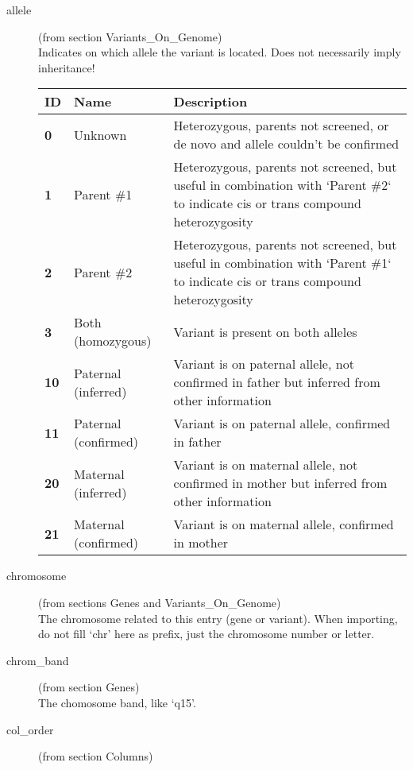 \documentclass[a4paper,oneside,openany,12pt]{memoir}
\begin{document}
\begin{description}
  \item[allele] (from section Variants\_On\_Genome)\hfill \\
  Indicates on which allele the variant is located.
  Does not necessarily imply inheritance!\\
  \begin{tabular}{>{\bfseries}p{0.6cm} p{4.0cm} p{10.0cm}}
    ID & \textbf{Name} & \textbf{Description}\\ \hline \hline
    0 & Unknown & Heterozygous, parents not screened, or de novo and allele couldn't be confirmed\\ \hline
    1 & Parent \#1 & Heterozygous, parents not screened, but useful in combination with `Parent \#2` to indicate cis or
      trans compound heterozygosity\\ \hline
    2 & Parent \#2 & Heterozygous, parents not screened, but useful in combination with `Parent \#1` to indicate cis or
      trans compound heterozygosity\\ \hline
    3 & Both (homozygous) & Variant is present on both alleles\\ \hline
    10 & Paternal (inferred) & Variant is on paternal allele, not confirmed in father but inferred from other
      information\\ \hline
    11 & Paternal (confirmed) & Variant is on paternal allele, confirmed in father\\ \hline
    20 & Maternal (inferred) & Variant is on maternal allele, not confirmed in mother but inferred from other
      information\\ \hline
    21 & Maternal (confirmed) & Variant is on maternal allele, confirmed in mother\\ \hline
  \end{tabular}
  \item[chromosome] (from sections Genes and Variants\_On\_Genome)\hfill \\
  The chromosome related to this entry (gene or variant).
  When importing, do not fill `chr' here as prefix, just the chromosome number or letter.
  \item[chrom\_band] (from section Genes)\hfill \\
  The chomosome band, like `q15'.
  \item[col\_order] (from section Columns)\hfill \\

\end{description}
\end{document}
